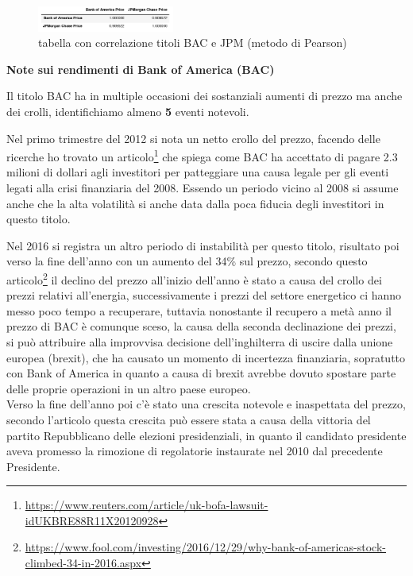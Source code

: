 \documentclass{article}
\begin{document}
\begin{figure}[h]
  \centering
  \includegraphics[width=0.4\textwidth]{corr_banc.png}
  \caption{tabella con correlazione titoli BAC e JPM (metodo di Pearson)}
  \label{fig:corr_banc}
\end{figure}

\textbf{Note sui rendimenti di Bank of America (BAC)}

Il titolo BAC ha in multiple occasioni dei sostanziali aumenti di prezzo ma anche dei crolli, identifichiamo almeno \textbf{5} eventi notevoli.

Nel primo trimestre del 2012 si nota un netto crollo del prezzo, facendo delle ricerche ho trovato un 
articolo\footnote{
  \href{https://www.reuters.com/article/uk-bofa-lawsuit-idUKBRE88R11X20120928}{https://www.reuters.com/article/uk-bofa-lawsuit-idUKBRE88R11X20120928}
}
che spiega come BAC ha accettato di pagare 2.3 milioni di dollari agli investitori per patteggiare una causa legale per gli eventi legati alla crisi finanziaria del 2008.
Essendo un periodo vicino al 2008 si assume anche che la alta volatilità si anche data dalla poca fiducia degli investitori in questo titolo.

Nel 2016 si registra un altro periodo di instabilità per questo titolo, risultato poi verso la fine dell'anno con un aumento del 34\% sul prezzo,
secondo questo 
articolo\footnote{
  \href{https://www.fool.com/investing/2016/12/29/why-bank-of-americas-stock-climbed-34-in-2016.aspx}{https://www.fool.com/investing/2016/12/29/why-bank-of-americas-stock-climbed-34-in-2016.aspx}
}
il declino del prezzo all'inizio dell'anno è stato a causa del crollo dei prezzi relativi all'energia,
successivamente i prezzi del settore energetico ci hanno messo poco tempo a recuperare, tuttavia nonostante il recupero a metà anno il prezzo di BAC è comunque sceso,
la causa della seconda declinazione dei prezzi, si può attribuire alla improvvisa decisione dell'inghilterra di uscire dalla unione europea (brexit), che ha causato un momento
di incertezza finanziaria, sopratutto con Bank of America in quanto a causa di brexit avrebbe dovuto spostare parte delle proprie operazioni in un altro paese europeo.\\
Verso la fine dell'anno poi c'è stato una crescita notevole e inaspettata del prezzo, secondo l'articolo questa crescita può essere stata a causa della vittoria del partito
Repubblicano delle elezioni presidenziali, in quanto il candidato presidente aveva promesso la rimozione di regolatorie instaurate nel 2010 dal precedente Presidente.
\end{document}
